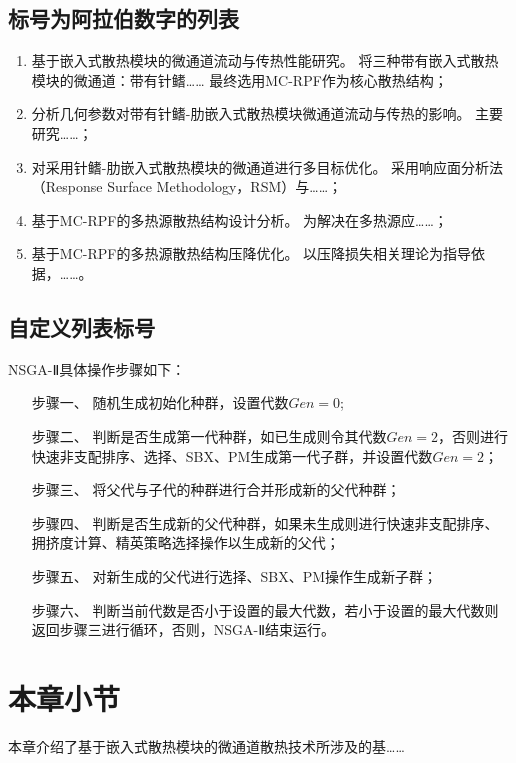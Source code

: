 \subsection{标号为阿拉伯数字的列表}

\begin{enumerate}[label =(\arabic*)]

    \item 基于嵌入式散热模块的微通道流动与传热性能研究。
          将三种带有嵌入式散热模块的微通道：带有针鳍……
          最终选用MC-RPF作为核心散热结构；
    \item 分析几何参数对带有针鳍-肋嵌入式散热模块微通道流动与传热的影响。
          主要研究……；
    \item 对采用针鳍-肋嵌入式散热模块的微通道进行多目标优化。
          采用响应面分析法（Response Surface Methodology，RSM）与……；
    \item 基于MC-RPF的多热源散热结构设计分析。
          为解决在多热源应……；
    \item 基于MC-RPF的多热源散热结构压降优化。
          以压降损失相关理论为指导依据，……。

\end{enumerate}

\subsection{自定义列表标号}
\noindent NSGA-Ⅱ具体操作步骤如下：
\begin{enumerate}[leftmargin = 6em, labelsep = 0em]
    \item[步骤一、] 随机生成初始化种群，设置代数$Gen = 0$;
    \item[步骤二、] 判断是否生成第一代种群，如已生成则令其代数$Gen = 2$，否则进行快速非支配排序、选择、SBX、PM生成第一代子群，并设置代数$Gen = 2$；
    \item[步骤三、] 将父代与子代的种群进行合并形成新的父代种群；
    \item[步骤四、] 判断是否生成新的父代种群，如果未生成则进行快速非支配排序、拥挤度计算、精英策略选择操作以生成新的父代；
    \item[步骤五、] 对新生成的父代进行选择、SBX、PM操作生成新子群；
    \item[步骤六、] 判断当前代数是否小于设置的最大代数，若小于设置的最大代数则返回步骤三进行循环，否则，NSGA-Ⅱ结束运行。
\end{enumerate}

\section{本章小节}
本章介绍了基于嵌入式散热模块的微通道散热技术所涉及的基……